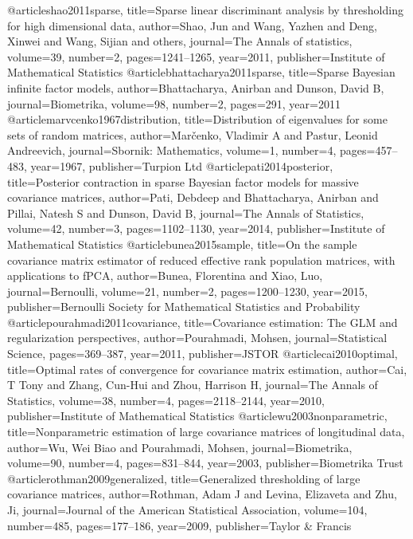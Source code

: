 @article{shao2011sparse,
  title={Sparse linear discriminant analysis by thresholding for high dimensional data},
  author={Shao, Jun and Wang, Yazhen and Deng, Xinwei and Wang, Sijian and others},
  journal={The Annals of statistics},
  volume={39},
  number={2},
  pages={1241--1265},
  year={2011},
  publisher={Institute of Mathematical Statistics}
}
@article{bhattacharya2011sparse,
  title={Sparse Bayesian infinite factor models},
  author={Bhattacharya, Anirban and Dunson, David B},
  journal={Biometrika},
  volume={98},
  number={2},
  pages={291},
  year={2011}
}
@article{marvcenko1967distribution,
  title={Distribution of eigenvalues for some sets of random matrices},
  author={Mar{\v{c}}enko, Vladimir A and Pastur, Leonid Andreevich},
  journal={Sbornik: Mathematics},
  volume={1},
  number={4},
  pages={457--483},
  year={1967},
  publisher={Turpion Ltd}
}
@article{pati2014posterior,
  title={Posterior contraction in sparse Bayesian factor models for massive covariance matrices},
  author={Pati, Debdeep and Bhattacharya, Anirban and Pillai, Natesh S and Dunson, David B},
  journal={The Annals of Statistics},
  volume={42},
  number={3},
  pages={1102--1130},
  year={2014},
  publisher={Institute of Mathematical Statistics}
}
@article{bunea2015sample,
  title={On the sample covariance matrix estimator of reduced effective rank population matrices, with applications to fPCA},
  author={Bunea, Florentina and Xiao, Luo},
  journal={Bernoulli},
  volume={21},
  number={2},
  pages={1200--1230},
  year={2015},
  publisher={Bernoulli Society for Mathematical Statistics and Probability}
}
@article{pourahmadi2011covariance,
  title={Covariance estimation: The GLM and regularization perspectives},
  author={Pourahmadi, Mohsen},
  journal={Statistical Science},
  pages={369--387},
  year={2011},
  publisher={JSTOR}
}
@article{cai2010optimal,
  title={Optimal rates of convergence for covariance matrix estimation},
  author={Cai, T Tony and Zhang, Cun-Hui and Zhou, Harrison H},
  journal={The Annals of Statistics},
  volume={38},
  number={4},
  pages={2118--2144},
  year={2010},
  publisher={Institute of Mathematical Statistics}
}
@article{wu2003nonparametric,
  title={Nonparametric estimation of large covariance matrices of longitudinal data},
  author={Wu, Wei Biao and Pourahmadi, Mohsen},
  journal={Biometrika},
  volume={90},
  number={4},
  pages={831--844},
  year={2003},
  publisher={Biometrika Trust}
}
@article{rothman2009generalized,
  title={Generalized thresholding of large covariance matrices},
  author={Rothman, Adam J and Levina, Elizaveta and Zhu, Ji},
  journal={Journal of the American Statistical Association},
  volume={104},
  number={485},
  pages={177--186},
  year={2009},
  publisher={Taylor \& Francis}
}
